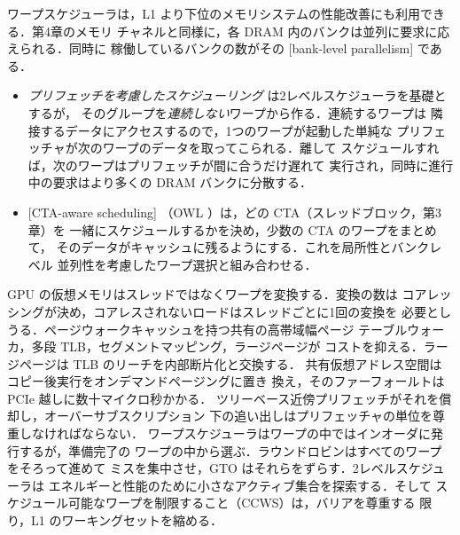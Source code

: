 \documentclass[../main.tex]{subfiles}
\begin{document}
ワープスケジューラは，L1 より下位のメモリシステムの性能改善にも利用できる．第4章のメモリ
チャネルと同様に，各 DRAM 内のバンクは並列に要求に応えられる．同時に
稼働しているバンクの数がその
[bank-level parallelism]
である．
\begin{itemize}
  \item \emph{プリフェッチを考慮したスケジューリング}
    \cite{jog2013orchestrated} は2レベルスケジューラを基礎とするが，
    そのグループを\emph{連続しない}ワープから作る．連続するワープは
    隣接するデータにアクセスするので，1つのワープが起動した単純な
    プリフェッチャが次のワープのデータを取ってこられる．離して
    スケジュールすれば，次のワープはプリフェッチが間に合うだけ遅れて
    実行され，同時に進行中の要求はより多くの DRAM バンクに分散する．
  \item {}[CTA-aware scheduling]
    （OWL \cite{jog2013owl}）は，どの CTA（スレッドブロック，第3章）を
    一緒にスケジュールするかを決め，少数の CTA のワープをまとめて，
    そのデータがキャッシュに残るようにする．これを局所性とバンクレベル
    並列性を考慮したワープ選択と組み合わせる．
\end{itemize}

\begin{keypoint}[章のまとめ]
  GPU の仮想メモリはスレッドではなくワープを変換する．変換の数は
  コアレッシングが決め，コアレスされないロードはスレッドごとに1回の変換を
  必要としうる．ページウォークキャッシュを持つ共有の高帯域幅ページ
  テーブルウォーカ，多段 TLB，セグメントマッピング，ラージページが
  コストを抑える．ラージページは TLB のリーチを内部断片化と交換する．
  共有仮想アドレス空間はコピー後実行をオンデマンドページングに置き
  換え，そのファーフォールトは PCIe 越しに数十マイクロ秒かかる．
  ツリーベース近傍プリフェッチがそれを償却し，オーバーサブスクリプション
  下の追い出しはプリフェッチャの単位を尊重しなければならない．
  ワープスケジューラはワープの中ではインオーダに発行するが，準備完了の
  ワープの中から選ぶ．ラウンドロビンはすべてのワープをそろって進めて
  ミスを集中させ，GTO はそれらをずらす．2レベルスケジューラは
  エネルギーと性能のために小さなアクティブ集合を探索する．そして
  スケジュール可能なワープを制限すること（CCWS）は，バリアを尊重する
  限り，L1 のワーキングセットを縮める．
\end{keypoint}
\end{document}
